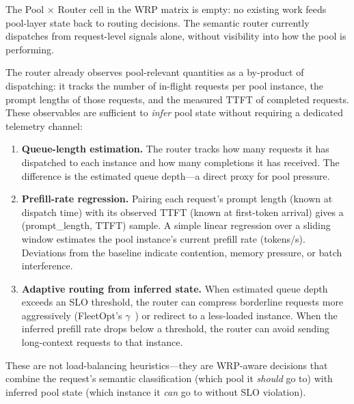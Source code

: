 \begin{opportunity}
\label{opp:pool-feedback}
The Pool $\times$ Router cell in the WRP matrix is empty: no
existing work feeds pool-layer state back to routing decisions.
The semantic router currently dispatches from request-level signals
alone, without visibility into how the pool is performing.

The router already observes pool-relevant quantities as a
by-product of dispatching: it tracks the number of in-flight
requests per pool instance, the prompt lengths of those requests,
and the measured TTFT of completed requests.  These observables
are sufficient to \emph{infer} pool state without requiring a
dedicated telemetry channel:
\begin{enumerate}[nosep]
  \item \textbf{Queue-length estimation.}  The router tracks how
        many requests it has dispatched to each instance and how
        many completions it has received.  The difference is the
        estimated queue depth---a direct proxy for pool pressure.
  \item \textbf{Prefill-rate regression.}  Pairing each request's
        prompt length (known at dispatch time) with its observed
        TTFT (known at first-token arrival) gives a
        (prompt\_length, TTFT) sample.  A simple linear regression
        over a sliding window estimates the pool instance's current
        prefill rate (tokens/s).  Deviations from the baseline
        indicate contention, memory pressure, or batch interference.
  \item \textbf{Adaptive routing from inferred state.}  When
        estimated queue depth exceeds an SLO threshold, the router
        can compress borderline requests more aggressively
        (FleetOpt's $\gamma$~\cite{fleetopt2026}) or redirect to a
        less-loaded instance.  When the inferred prefill rate drops
        below a threshold, the router can avoid sending long-context
        requests to that instance.
\end{enumerate}
These are not load-balancing heuristics---they are WRP-aware
decisions that combine the request's semantic classification (which
pool it \emph{should} go to) with inferred pool state (which
instance it \emph{can} go to without SLO violation).


\end{opportunity}

